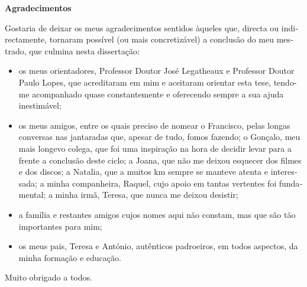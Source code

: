 
\cleardoublepage\thispagestyle{plain}

\begin{otherlanguage}{portuguese}
  \textbf{\Large Agradecimentos}

  Gostaria de deixar os meus agradecimentos sentidos àqueles que, directa ou indirectamente, tornaram possível (ou mais concretizável) a conclusão do meu mestrado, que culmina nesta dissertação:
  \begin{itemize}
    \item os meus orientadores, Professor Doutor José Legatheaux e Professor Doutor Paulo Lopes, que acreditaram em mim e aceitaram orientar esta tese, tendo-me acompanhado quase constantemente e oferecendo sempre a sua ajuda inestimável;
    \item os meus amigos, entre os quais preciso de nomear o Francisco, pelas longas conversas nas jantaradas que, apesar de tudo, fomos fazendo; o Gonçalo, meu mais longevo colega, que foi uma inspiração na hora de decidir levar para a frente a conclusão deste ciclo; a Joana, que não me deixou esquecer dos filmes e dos discos; a Natalia, que a muitos km sempre se manteve atenta e interessada; a minha companheira, Raquel, cujo apoio em tantas vertentes foi fundamental; a minha irmã, Teresa, que nunca me deixou desistir;
    \item a família e restantes amigos cujos nomes aqui não constam, mas que são tão importantes para mim;
    \item os meus pais, Teresa e António, autênticos padroeiros, em todos aspectos, da minha formação e educação.
  \end{itemize}

  Muito obrigado a todos.
\end{otherlanguage}
